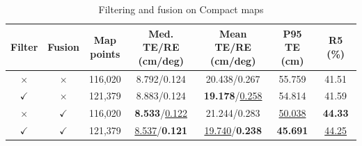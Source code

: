 \begin{table}[!t]
\centering
\footnotesize
\setlength{\tabcolsep}{1.3pt}
\renewcommand{\arraystretch}{1.15}
\caption{Filtering and fusion on Compact maps}\label{tab:t6}
\begin{tabular*}{\linewidth}{@{\extracolsep{\fill}}ccccccc@{}}
\toprule
Filter & Fusion & \shortstack{Map\\points} & \shortstack{Med. TE/RE\\(cm/deg)} & \shortstack{Mean TE/RE\\(cm/deg)} & \shortstack{P95 TE\\(cm)} & R5 (\%) \\
\midrule
$\times$ & $\times$ & 116,020 & 8.792/0.124 & 20.438/0.267 & 55.759 & 41.51 \\
$\checkmark$ & $\times$ & 121,379 & 8.883/0.124 & \textbf{19.178}/\underline{0.258} & 54.814 & 41.59 \\
$\times$ & $\checkmark$ & 116,020 & \textbf{8.533}/\underline{0.122} & 21.244/0.283 & \underline{50.038} & \textbf{44.33} \\
$\checkmark$ & $\checkmark$ & 121,379 & \underline{8.537}/\textbf{0.121} & \underline{19.740}/\textbf{0.238} & \textbf{45.691} & \underline{44.25} \\
\bottomrule
\end{tabular*}
\end{table}
